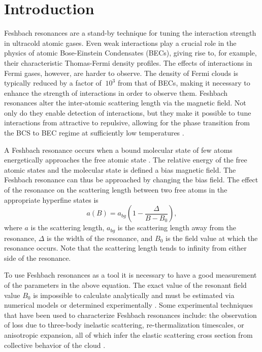 \documentclass[12pt]{iopart}
\begin{document}
\section{Introduction}
Feshbach resonances are a stand-by technique for tuning the interaction strength in ultracold atomic gases. Even weak interactions play a crucial role in the physics of atomic Bose-Einstein Condensates (BECs), giving rise to, for example, their characteristic Thomas-Fermi density profiles. The effects of interactions in Fermi gases, however, are harder to observe. The density of Fermi clouds is typically reduced by a factor of $~10^3$ from that of BECs, making it necessary to enhance the strength of interactions in order to observe them. Feshbach resonances alter the inter-atomic scattering length via the magnetic field. Not only do they enable detection of interactions, but they make it possible to tune interactions from attractive to repulsive, allowing for the phase transition from the BCS to BEC regime at sufficiently low temperatures \cite{RegalThesis}. 
\par A Feshbach resonance occurs when a bound molecular state of few atoms energetically approaches the free atomic state \cite{Chin10}. The relative energy of the free atomic states and the molecular state is defined a bias magnetic field. The Feshbach resonance can thus be approached by changing the bias field. The effect of the resonance on the scattering length between two free atoms in the appropriate hyperfine states is
\begin{equation}
a(B)=a_{bg}\left(1-\frac{\Delta}{B-B_0}\right),
\label{feshbachEq}
\end{equation}
where $a$ is the scattering length, $a_{bg}$ is the scattering length away from the resonance, $\Delta$ is the width of the resonance, and $B_0$ is the field value at which the resonance occurs. Note that the scattering length tends to infinity from either side of the resonance.
\par To use Feshbach resonances as a tool it  is necessary to have a good measurement of the parameters in the above equation.  The exact value of the resonant field value $B_0$ is impossible to calculate analytically and must be estimated via numerical models \cite{Lysebo09, Gao11} or determined experimentally \cite{Inouye98, Cornish00}. Some experimental techniques that have been used to characterize Feshbach resonances include: the observation of loss due to three-body inelastic scattering, re-thermalization timescales, or anisotropic expansion, all of which infer the elastic scattering cross section from collective behavior of the cloud \cite{Regal03,OHara02,Monroe93}. 
\end{document}
